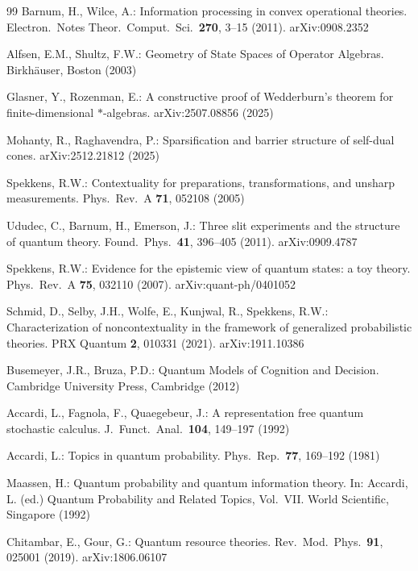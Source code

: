\documentclass[11pt]{article}
\theoremstyle{remark}
\begin{document}
\begin{thebibliography}{99}
 Barnum, H., Wilce, A.: Information processing in convex operational theories. Electron.\ Notes Theor.\ Comput.\ Sci.\ \textbf{270}, 3--15 (2011). arXiv:0908.2352

 Alfsen, E.M., Shultz, F.W.: Geometry of State Spaces of Operator Algebras. Birkh\"auser, Boston (2003)

 Glasner, Y., Rozenman, E.: A constructive proof of Wedderburn's theorem for finite-dimensional $*$-algebras. arXiv:2507.08856 (2025)

 Mohanty, R., Raghavendra, P.: Sparsification and barrier structure of self-dual cones. arXiv:2512.21812 (2025)

 Spekkens, R.W.: Contextuality for preparations, transformations, and unsharp measurements. Phys.\ Rev.\ A \textbf{71}, 052108 (2005)

 Ududec, C., Barnum, H., Emerson, J.: Three slit experiments and the structure of quantum theory. Found.\ Phys.\ \textbf{41}, 396--405 (2011). arXiv:0909.4787

 Spekkens, R.W.: Evidence for the epistemic view of quantum states: a toy theory. Phys.\ Rev.\ A \textbf{75}, 032110 (2007). arXiv:quant-ph/0401052

 Schmid, D., Selby, J.H., Wolfe, E., Kunjwal, R., Spekkens, R.W.: Characterization of noncontextuality in the framework of generalized probabilistic theories. PRX Quantum \textbf{2}, 010331 (2021). arXiv:1911.10386

 Busemeyer, J.R., Bruza, P.D.: Quantum Models of Cognition and Decision. Cambridge University Press, Cambridge (2012)

 Accardi, L., Fagnola, F., Quaegebeur, J.: A representation free quantum stochastic calculus. J.\ Funct.\ Anal.\ \textbf{104}, 149--197 (1992)

 Accardi, L.: Topics in quantum probability. Phys.\ Rep.\ \textbf{77}, 169--192 (1981)

 Maassen, H.: Quantum probability and quantum information theory. In: Accardi, L. (ed.) Quantum Probability and Related Topics, Vol.\ VII. World Scientific, Singapore (1992)

 Chitambar, E., Gour, G.: Quantum resource theories. Rev.\ Mod.\ Phys.\ \textbf{91}, 025001 (2019). arXiv:1806.06107


\end{thebibliography}
\end{document}
